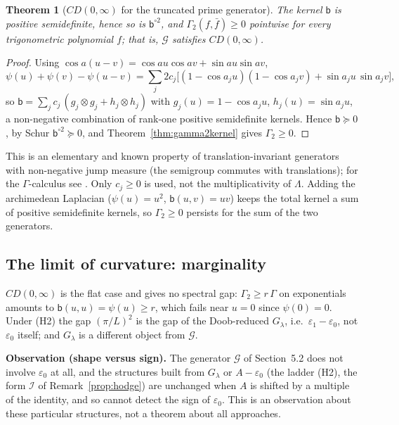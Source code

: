 \documentclass[11pt]{amsart}
\newtheorem{theorem}{Theorem}[section]
\theoremstyle{definition}
\theoremstyle{remark}
\newcommand{\Lam}{\Lambda}
\newcommand{\eps}{\varepsilon}
\newcommand{\bk}{\mathsf{b}}
\begin{document}
\begin{theorem}[$CD(0,\infty)$ for the truncated prime generator]\label{thm:CD0}
The kernel $\bk$ is positive semidefinite, hence so is $\bk^{\circ2}$, and
$\Gamma_2(f,\bar f)\ge0$ pointwise for every trigonometric polynomial $f$; that is, $\mathcal G$
satisfies $CD(0,\infty)$.
\end{theorem}
\begin{proof}
Using $\cos a(u-v)=\cos au\cos av+\sin au\sin av$,
\[
   \psi(u)+\psi(v)-\psi(u-v)=\sum_j 2c_j\big[(1-\cos a_ju)(1-\cos a_jv)+\sin a_ju\,\sin a_jv\big],
\]
so $\bk=\sum_j c_j\,(g_j\otimes g_j+h_j\otimes h_j)$ with $g_j(u)=1-\cos a_ju$,
$h_j(u)=\sin a_ju$, a non-negative combination of rank-one positive semidefinite kernels. Hence
$\bk\succeq0$, by Schur $\bk^{\circ2}\succeq0$, and Theorem~\ref{thm:gamma2kernel} gives
$\Gamma_2\ge0$.
\end{proof}

\noindent This is an elementary and known property of translation-invariant generators with
non-negative jump measure (the semigroup commutes with translations); for the $\Gamma$-calculus see
\cite{BE,BGL}. Only $c_j\ge0$ is used, not
the multiplicativity of $\Lam$. Adding the archimedean Laplacian ($\psi(u)=u^2$, $\bk(u,v)=uv$)
keeps the total kernel a sum of positive semidefinite kernels, so $\Gamma_2\ge0$ persists for the
sum of the two generators.

\subsection{The limit of curvature: marginality}
$CD(0,\infty)$ is the flat case and gives no spectral gap: $\Gamma_2\ge r\,\Gamma$ on exponentials
amounts to $\bk(u,u)=\psi(u)\ge r$, which fails near $u=0$ since $\psi(0)=0$. Under (H2) the gap
$(\pi/L)^2$ is the gap of the Doob-reduced $G_\lambda$, i.e.\ $\eps_1-\eps_0$, not $\eps_0$ itself;
and $G_\lambda$ is a different object from $\mathcal G$.

\medskip\noindent\textbf{Observation (shape versus sign).}
The generator $\mathcal G$ of Section~5.2 does not involve $\eps_0$ at all, and the structures
built from $G_\lambda$ or $A-\eps_0$ (the ladder (H2), the form $\mathcal I$ of Remark~\ref{prop:hodge}) are unchanged when $A$ is shifted by a
multiple of the identity, and so cannot detect the sign of $\eps_0$. This is an observation about
these particular structures, not a theorem about all approaches.
\medskip

\end{document}
